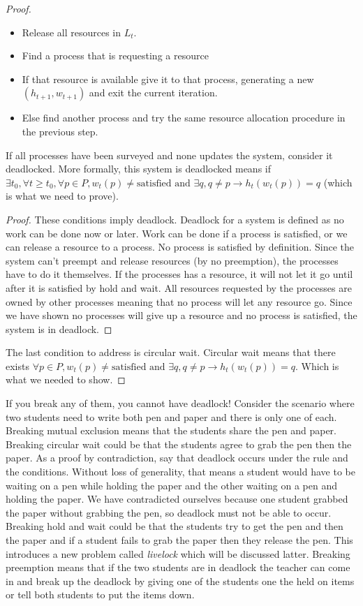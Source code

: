 \begin{proof}
\begin{itemize}
\item Release all resources in $L_t$.
\item Find a process that is requesting a resource
\item If that resource is available give it to that process, generating a new $(h_{t+1}, w_{t+1})$ and exit the current iteration.
\item Else find another process and try the same resource allocation procedure in the previous step.
\end{itemize}

If all processes have been surveyed and none updates the system, consider it deadlocked.
More formally, this system is deadlocked means  if $\exists t_0, \forall t \geq t_0, \forall p \in P, w_t(p) \neq \text{satisfied} \text{ and } \exists q, q \neq p \rightarrow h_t(w_t(p)) = q$ (which is what we need to prove).

\begin{proof} These conditions imply deadlock.
  Deadlock for a system is defined as no work can be done now or later.
  Work can be done if a process is satisfied, or we can release a resource to a process.
  No process is satisfied by definition.
  Since the system can't preempt and release resources (by no preemption), the processes have to do it themselves.
  If the processes has a resource, it will not let it go until after it is satisfied by hold and wait.
  All resources requested by the processes are owned by other processes meaning that no process will let any resource go.
  Since we have shown no processes will give up a resource and no process is satisfied, the system is in deadlock.
\end{proof}
The last condition to address is circular wait.
Circular wait means that there exists $\forall p \in P, w_t(p) \neq \text{satisfied} \text{ and } \exists q, q \neq p \rightarrow h_t(w_t(p)) = q$.
Which is what we needed to show.
\end{proof}

If you break any of them, you cannot have deadlock! Consider the scenario where two students need to write both pen and paper and there is only one of each. Breaking mutual exclusion means that the students share the pen and paper. Breaking circular wait could be that the students agree to grab the pen then the paper. As a proof by contradiction, say that deadlock occurs under the rule and the conditions. Without loss of generality, that means a student would have to be waiting on a pen while holding the paper and the other waiting on a pen and holding the paper. We have contradicted ourselves because one student grabbed the paper without grabbing the pen, so deadlock must not be able to occur. Breaking hold and wait could be that the students try to get the pen and then the paper and if a student fails to grab the paper then they release the pen. This introduces a new problem called \textit{livelock} which will be discussed latter. Breaking preemption means that if the two students are in deadlock the teacher can come in and break up the deadlock by giving one of the students one the held on items or tell both students to put the items down.

